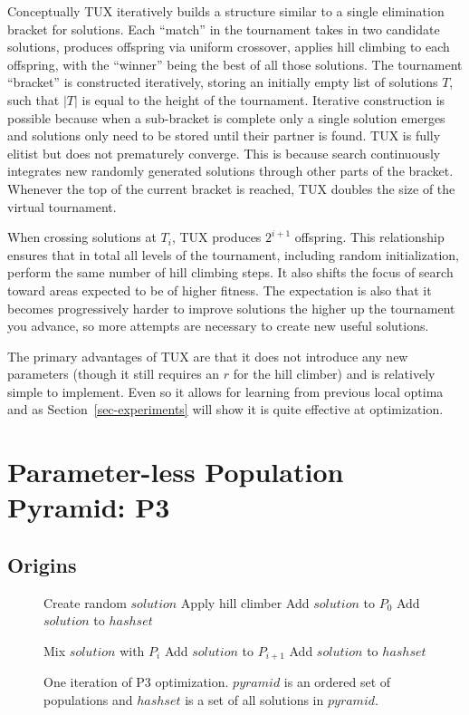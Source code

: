 \documentclass{sig-alternate}
\begin{document}
Conceptually TUX iteratively builds a structure similar to a single elimination
bracket for solutions. Each ``match'' in the tournament takes in two candidate solutions,
produces offspring via uniform crossover, applies hill climbing to each offspring, with
the ``winner'' being the best of all those solutions. The tournament ``bracket'' is constructed
iteratively, storing an initially empty list of solutions $T$, such that $|T|$ is equal to the height
of the tournament. Iterative construction is possible because when a sub-bracket is complete only a single solution
emerges and solutions only need to be stored until their partner is found.
TUX is fully elitist but does not prematurely converge. This is because search continuously
integrates new randomly generated solutions through other parts of the bracket. Whenever the
top of the current bracket is reached, TUX doubles the size of the virtual tournament.

When crossing solutions at $T_i$, TUX produces $2^{i+1}$ offspring. This relationship
ensures that in total all levels of the tournament, including random initialization,
perform the same number of hill climbing steps. It also shifts the focus of search toward
areas expected to be of higher fitness. The expectation is also that it becomes progressively
harder to improve solutions the higher up the tournament you advance, so more attempts
are necessary to create new useful solutions.

The primary advantages of TUX are that it does not introduce any new parameters (though it still
requires an $r$ for the hill climber) and is relatively simple to implement. Even so
it allows for learning from previous local optima and as Section~\ref{sec-experiments}
will show it is quite effective at optimization.

\section{Parameter-less Population\\ Pyramid: P3}
\subsection{Origins}
\begin{figure}
  \begin{algorithmic}[1]
    \State Create random $solution$
    \State Apply hill climber
      \State Add $solution$ to $P_0$
      \State Add $solution$ to $hashset$
    \EndIf

      \State Mix $solution$ with $P_i$
          \State Add $solution$ to $P_{i+1}$
          \State Add $solution$ to $hashset$
        \EndIf
      \EndIf
    \EndFor
  \EndProcedure
\end{algorithmic}
  \caption{One iteration of P3 optimization. $pyramid$ is an
           ordered set of populations and $hashset$ is a set
           of all solutions in $pyramid$.}
  \label{fig-p3}
\end{figure}
\end{document}
